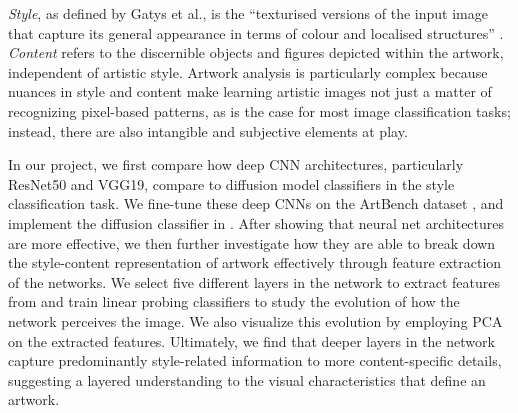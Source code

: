 \documentclass[twocolumn]{article}
\begin{document}
\textit{Style}, as defined by Gatys et al., is the ``texturised versions of the input image that capture its general appearance in terms of colour and localised structures'' \cite{gatysNeuralAlgorithmArtistic2015}. \textit{Content} refers to the discernible objects and figures depicted within the artwork, independent of artistic style. Artwork analysis is particularly complex because nuances in style and content make learning artistic images not just a matter of recognizing pixel-based patterns, as is the case for most image classification tasks; instead, there are also intangible and subjective elements at play.


In our project, we first compare how deep CNN architectures, particularly ResNet50 and VGG19, compare to diffusion model classifiers in the style classification task. We fine-tune these deep CNNs on the ArtBench dataset \cite{liaoArtBenchDatasetBenchmarking2022a}, and implement the diffusion classifier in \cite{liYourDiffusionModel}. After showing that neural net architectures are more effective, we then further investigate how they are able to break down the style-content representation of artwork effectively through feature extraction of the networks. We select five different layers in the network to extract features from and train linear probing classifiers to study the evolution of how the network perceives the image. We also visualize this evolution by employing PCA on the extracted features. Ultimately, we find that deeper layers in the network capture predominantly style-related information to more content-specific details, suggesting a layered understanding to the visual characteristics that define an artwork.
\end{document}
